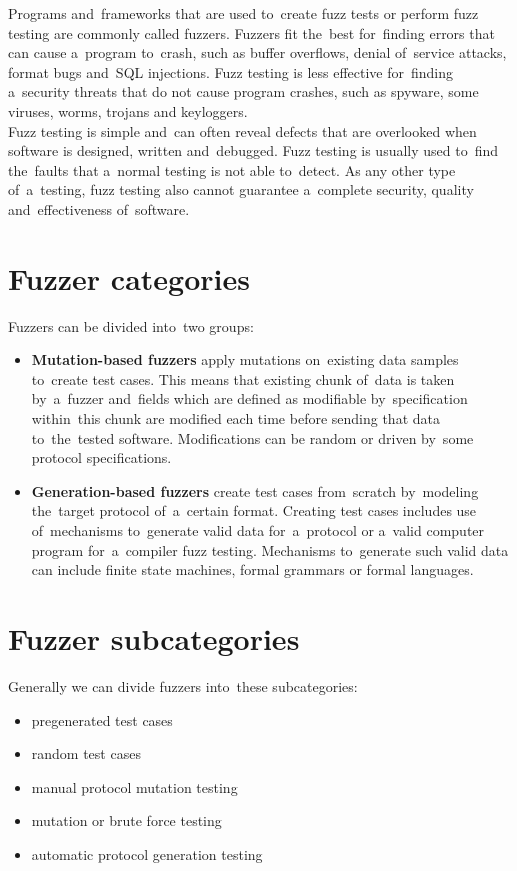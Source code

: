 Programs and~frameworks that are used to~create fuzz tests or perform fuzz
testing are commonly called fuzzers. Fuzzers fit the~best for~finding errors that
can cause a~program to~crash, such as buffer overflows, denial of~service attacks,
format bugs and~SQL injections. Fuzz testing is less effective for~finding a~security
threats that do not cause program crashes, such as spyware, some viruses, worms,
trojans and keyloggers.\\

Fuzz testing is simple and~can often reveal defects that are overlooked when
software is designed, written and~debugged. Fuzz testing is usually used to~find
the~faults that a~normal testing is not able to~detect. As any other type
of~a~testing, fuzz testing also cannot guarantee a~complete security, quality
and~effectiveness of~software.


\section{Fuzzer categories} \label{sec:cat}
Fuzzers can be divided into~two groups:
\begin{itemize}
	\item \textbf{Mutation-based fuzzers} apply mutations on~existing data samples
	to~create test cases. This means that existing chunk of~data is taken by~a~fuzzer
	and~fields which are defined as modifiable by~specification within~this chunk are
	modified each time before sending that data to~the~tested software. Modifications
	can be random or driven by~some protocol specifications.
	\item \textbf{Generation-based fuzzers} create test cases from~scratch by~modeling
	the~target protocol of~a~certain format. Creating test cases includes use
	of~mechanisms to~generate valid data for~a~protocol or a~valid computer program
	for~a~compiler fuzz testing. Mechanisms to~generate such valid data can include
	finite state machines, formal grammars or formal languages.
\end{itemize}


\section{Fuzzer subcategories} \label{sec:subcat}
Generally we can divide fuzzers into~these subcategories:
\begin{itemize}
	\item pregenerated test cases
	\item random test cases
	\item manual protocol mutation testing
	\item mutation or brute force testing
	\item automatic protocol generation testing
\end{itemize}


